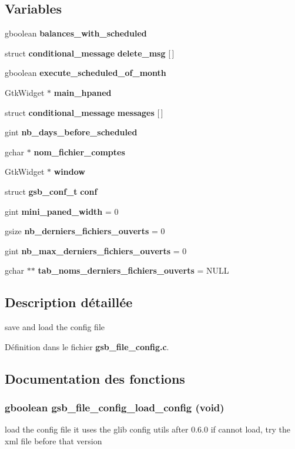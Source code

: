 \subsection*{Variables}
\begin{DoxyCompactItemize}
\item 
gboolean {\bf balances\_\-with\_\-scheduled}
\item 
struct {\bf conditional\_\-message} {\bf delete\_\-msg} [$\,$]
\item 
gboolean {\bf execute\_\-scheduled\_\-of\_\-month}
\item 
GtkWidget $\ast$ {\bf main\_\-hpaned}
\item 
struct {\bf conditional\_\-message} {\bf messages} [$\,$]
\item 
gint {\bf nb\_\-days\_\-before\_\-scheduled}
\item 
gchar $\ast$ {\bf nom\_\-fichier\_\-comptes}
\item 
GtkWidget $\ast$ {\bf window}
\item 
struct {\bf gsb\_\-conf\_\-t} {\bf conf}
\item 
gint {\bf mini\_\-paned\_\-width} = 0
\item 
gsize {\bf nb\_\-derniers\_\-fichiers\_\-ouverts} = 0
\item 
gint {\bf nb\_\-max\_\-derniers\_\-fichiers\_\-ouverts} = 0
\item 
gchar $\ast$$\ast$ {\bf tab\_\-noms\_\-derniers\_\-fichiers\_\-ouverts} = NULL
\end{DoxyCompactItemize}


\subsection{Description détaillée}
save and load the config file 

Définition dans le fichier {\bf gsb\_\-file\_\-config.c}.



\subsection{Documentation des fonctions}
\subsubsection[{gsb\_\-file\_\-config\_\-load\_\-config}]{\setlength{\rightskip}{0pt plus 5cm}gboolean gsb\_\-file\_\-config\_\-load\_\-config (void)}\label{gsb__file__config_8c_a75e81d75a401a5e21644fd1e61a3d32f}
load the config file it uses the glib config utils after 0.6.0 if cannot load, try the xml file before that version


